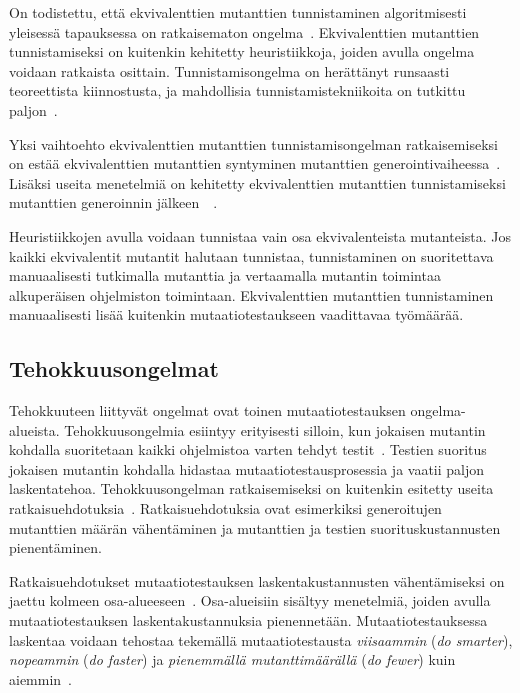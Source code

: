 \documentclass[finnish, grading]{tktltiki2}
\theoremstyle{definition}
\theoremstyle{remark}
\begin{document}
\vspace{1\baselineskip}On todistettu, että ekvivalenttien mutanttien tunnistaminen algoritmisesti yleisessä tapauksessa on ratkaisematon ongelma~\cite[s. 79]{Offutt:Ma:Kwon:2006:MuClassLevel}. Ekvivalenttien mutanttien tunnistamiseksi on kuitenkin kehitetty heuristiikkoja, joiden avulla ongelma voidaan ratkaista osittain. Tunnistamisongelma on herättänyt runsaasti teoreettista kiinnostusta, ja mahdollisia tunnistamistekniikoita on tutkittu paljon~\cite[s. 657]{Jia:Harman:2011}. 

Yksi vaihtoehto ekvivalenttien mutanttien tunnistamisongelman ratkaisemiseksi on estää ekvivalenttien mutanttien syntyminen mutanttien generointivaiheessa~\cite[s. 80]{Offutt:Ma:Kwon:2006:MuClassLevel}. Lisäksi useita menetelmiä on kehitetty ekvivalenttien mutanttien tunnistamiseksi mutanttien generoinnin jälkeen~\cite[s. 79]{Offutt:Ma:Kwon:2006:MuClassLevel}~\cite[s. 657]{Jia:Harman:2011}.

Heuristiikkojen avulla voidaan tunnistaa vain osa ekvivalenteista mutanteista. Jos kaikki ekvivalentit mutantit halutaan tunnistaa, tunnistaminen on suoritettava manuaalisesti tutkimalla mutanttia ja vertaamalla mutantin toimintaa alkuperäisen ohjelmiston toimintaan. Ekvivalenttien mutanttien tunnistaminen manuaalisesti lisää kuitenkin mutaatiotestaukseen vaadittavaa työmäärää.

\subsection{Tehokkuusongelmat}

Tehokkuuteen liittyvät ongelmat ovat toinen mutaatiotestauksen ongelma-alueista. Tehokkuusongelmia esiintyy erityisesti silloin, kun jokaisen mutantin kohdalla suoritetaan kaikki ohjelmistoa varten tehdyt testit~\cite[s. 652]{Jia:Harman:2011}. Testien suoritus jokaisen mutantin kohdalla hidastaa mutaatiotestausprosessia ja vaatii paljon laskentatehoa. Tehokkuusongelman ratkaisemiseksi on kuitenkin esitetty useita ratkaisuehdotuksia~\cite[s. 653]{Jia:Harman:2011}. Ratkaisuehdotuksia ovat esimerkiksi generoitujen mutanttien määrän vähentäminen ja mutanttien ja testien suorituskustannusten pienentäminen.

Ratkaisuehdotukset mutaatiotestauksen laskentakustannusten vähentämiseksi on jaettu kolmeen osa-alueeseen~\cite[s. 37]{Offutt:Untch:2001}. Osa-alueisiin sisältyy menetelmiä, joiden avulla mutaatiotestauksen laskentakustannuksia pienennetään. Mutaatiotestauksessa laskentaa voidaan tehostaa tekemällä mutaatiotestausta \textit{viisaammin} (\textit{do smarter}), \textit{nopeammin} (\textit{do faster}) ja \textit{pienemmällä mutanttimäärällä} (\textit{do fewer}) kuin aiemmin~\cite[s. 37]{Offutt:Untch:2001}.
\end{document}
